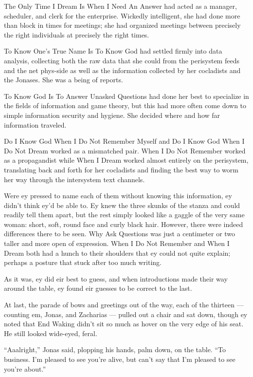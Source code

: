 The Only Time I Dream Is When I Need An Answer had acted as a manager, scheduler, and clerk for the enterprise. Wickedly intelligent, she had done more than block in times for meetings; she had organized meetings between precisely the right individuals at precisely the right times.

To Know One's True Name Is To Know God had settled firmly into data analysis, collecting both the raw data that she could from the perisystem feeds and the net phys-side as well as the information collected by her cocladists and the Jonases. She was a being of reports.

To Know God Is To Answer Unasked Questions had done her best to specialize in the fields of information and game theory, but this had more often come down to simple information security and hygiene. She decided where and how far information traveled.

Do I Know God When I Do Not Remember Myself and Do I Know God When I Do Not Dream worked as a mismatched pair. When I Do Not Remember worked as a propagandist while When I Dream worked almost entirely on the perisystem, translating back and forth for her cocladists and finding the best way to worm her way through the intersystem text channels.

Were ey pressed to name each of them without knowing this information, ey didn't think ey'd be able to. Ey knew the three skunks of the stanza and could readily tell them apart, but the rest simply looked like a gaggle of the very same woman: short, soft, round face and curly black hair. However, there were indeed differences there to be seen. Why Ask Questions was just a centimeter or two taller and more open of expression. When I Do Not Remember and When I Dream both had a hunch to their shoulders that ey could not quite explain; perhaps a posture that stuck after too much writing.

As it was, ey did eir best to guess, and when introductions made their way around the table, ey found eir guesses to be correct to the last.

At last, the parade of bows and greetings out of the way, each of the thirteen — counting em, Jonas, and Zacharias — pulled out a chair and sat down, though ey noted that End Waking didn't sit so much as hover on the very edge of his seat. He still looked wide-eyed, feral.

``Aaalright,'' Jonas said, plopping his hands, palm down, on the table. ``To business. I'm pleased to see you're alive, but can't say that I'm pleased to see you're about.''

